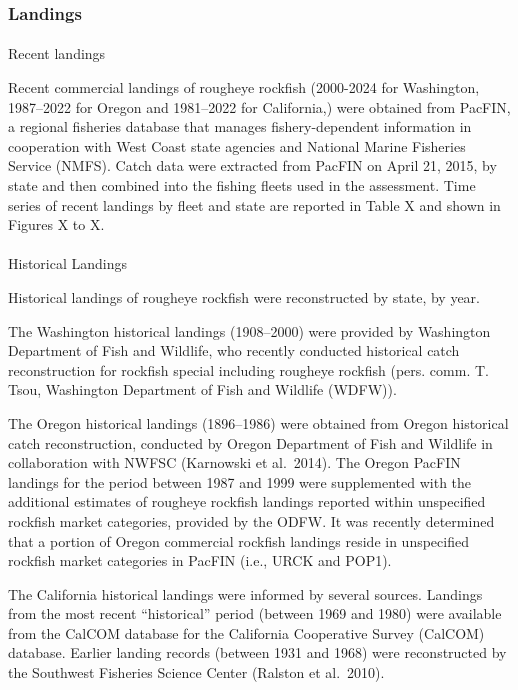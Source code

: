 \documentclass[
]{scrartcl}
\makeatletter
\let\oldparagraph\paragraph
\renewcommand{\paragraph}{
    \@ifstar
      \xxxParagraphStar
      \xxxParagraphNoStar
  }
\newcommand{\xxxParagraphStar}[1]{\oldparagraph*{#1}\mbox{}}
\newcommand{\xxxParagraphNoStar}[1]{\oldparagraph{#1}\mbox{}}
\makeatother
\begin{document}
\subsubsection{Landings}\label{landings}

\paragraph{Recent landings}\label{recent-landings}

Recent commercial landings of rougheye rockfish (2000-2024 for
Washington, 1987--2022 for Oregon and 1981--2022 for California,) were
obtained from PacFIN, a regional fisheries database that manages
fishery-dependent information in cooperation with West Coast state
agencies and National Marine Fisheries Service (NMFS). Catch data were
extracted from PacFIN on April 21, 2015, by state and then combined into
the fishing fleets used in the assessment. Time series of recent
landings by fleet and state are reported in Table X and shown in Figures
X to X.

\paragraph{Historical Landings}\label{historical-landings}

Historical landings of rougheye rockfish were reconstructed by state, by
year.

The Washington historical landings (1908--2000) were provided by
Washington Department of Fish and Wildlife, who recently conducted
historical catch reconstruction for rockfish special including rougheye
rockfish (pers. comm. T. Tsou, Washington Department of Fish and
Wildlife (WDFW)).

The Oregon historical landings (1896--1986) were obtained from Oregon
historical catch reconstruction, conducted by Oregon Department of Fish
and Wildlife in collaboration with NWFSC (Karnowski et al.~2014). The
Oregon PacFIN landings for the period between 1987 and 1999 were
supplemented with the additional estimates of rougheye rockfish landings
reported within unspecified rockfish market categories, provided by the
ODFW. It was recently determined that a portion of Oregon commercial
rockfish landings reside in unspecified rockfish market categories in
PacFIN (i.e., URCK and POP1).

The California historical landings were informed by several sources.
Landings from the most recent ``historical'' period (between 1969 and
1980) were available from the CalCOM database for the California
Cooperative Survey (CalCOM) database. Earlier landing records (between
1931 and 1968) were reconstructed by the Southwest Fisheries Science
Center (Ralston et al.~2010).
\end{document}
